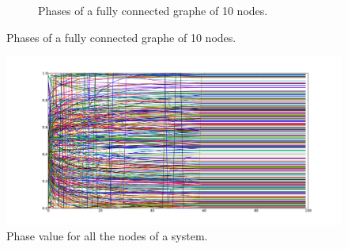 \documentclass{beamer}
\begin{document}
\begin{frame}
\begin{figure}[t]
\begin{subfigure}[h]{0.4\textwidth}
		\caption{\footnotesize{Phases of a fully connected graphe of 10 nodes.}}\label{fig:Phases}
	\end{subfigure}
\end{figure}
\begin{figure}[b]
	\centering
	\vspace{-20pt}
	\includegraphics[height=0.35\textheight]{Figure/all_nodes.pdf}
	\caption{Phase value for all the nodes of a system.}\label{fig:CompleteSystem}
\end{figure}

\end{frame}

\end{document}
